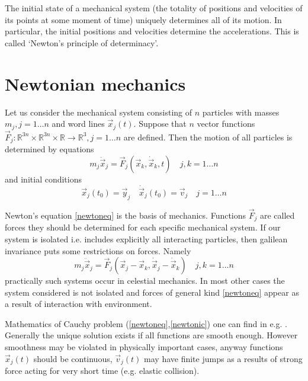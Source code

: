 The initial state of a mechanical system (the totality of positions and
velocities of its points at some moment of time) uniquely determines all of
its motion. In particular, the initial positions and velocities determine the accelerations.
This is called `Newton's principle of determinacy'.

\section{Newtonian mechanics}
\label{newt-mech}

Let us consider the mechanical system consisting of $n$ particles 
with masses $m_j,j=1\ldots n$ and word lines $\vec x_j(t)$.
Suppose that $n$ vector functions  
$\vec F_j:\mathbb{R}^{3 n}\times\mathbb{R}^{3 n}\times\mathbb{R}\rightarrow\mathbb{R}^3,j=1\ldots n$ 
are defined. Then the motion of all particles is determined by equations
\begin{equation}
  \label {newtoneq}
    m_j \ddot \vec x_j=\vec F_j(\vec x_k,\dot \vec x_k,t) \quad j,k=1\ldots n 
\end{equation}
and initial conditions
\begin{equation}
\label {newtonic}
   \vec x_j(t_0)=\vec y_j\quad\dot \vec x_j(t_0)=\vec v_j  \quad j=1\ldots n \end{equation}

Newton's equation \eqref{newtoneq} is  the basis of mechanics. Functions $\vec F_j$
are called forces they should be determined  for each specific mechanical system. If our system
is isolated i.e. includes explicitly all interacting particles, then galilean invariance puts some restrictions on forces.
Namely 
\begin{equation}
  \label {newtoneq-isolated}
    m_j \ddot \vec x_j=\vec F_j(\vec x_j-\vec x_k,\dot \vec x_j-\dot \vec x_k) \quad j,k=1\ldots n 
\end{equation}
practically such systems occur in celestial mechanics. In most other cases the system 
considered is not isolated and forces of general kind \eqref{newtoneq} appear as a result 
of interaction with environment.


Mathematics of  Cauchy problem (\ref{newtoneq},\ref{newtonic}) 
one can find in e.g. \cite{Arnold-ode}. Generally the unique solution exists if
all functions are smooth enough. However smoothness may be violated in physically
important cases, anyway functions $\vec x_j(t)$ should be continuous, $\vec v_j(t)$  may
have finite jumps as a results of strong force acting for very short time (e.g. 
elastic collision).

